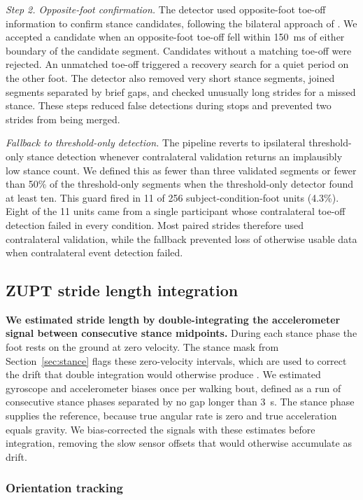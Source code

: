 \documentclass[11pt]{article}
\begin{document}
\textit{Step 2. Opposite-foot confirmation.} The detector used opposite-foot toe-off information to confirm stance candidates, following the bilateral approach of \citet{Arens2021}. We accepted a candidate when an opposite-foot toe-off fell within 150~ms of either boundary of the candidate segment. Candidates without a matching toe-off were rejected. An unmatched toe-off triggered a recovery search for a quiet period on the other foot. The detector also removed very short stance segments, joined segments separated by brief gaps, and checked unusually long strides for a missed stance. These steps reduced false detections during stops and prevented two strides from being merged.

\textit{Fallback to threshold-only detection.} The pipeline reverts to ipsilateral threshold-only stance detection whenever contralateral validation returns an implausibly low stance count. We defined this as fewer than three validated segments or fewer than 50\% of the threshold-only segments when the threshold-only detector found at least ten. This guard fired in 11 of 256 subject-condition-foot units (4.3\%). Eight of the 11 units came from a single participant whose contralateral toe-off detection failed in every condition. Most paired strides therefore used contralateral validation, while the fallback prevented loss of otherwise usable data when contralateral event detection failed.

\subsection{ZUPT stride length integration}

\textbf{We estimated stride length by double-integrating the accelerometer signal between consecutive stance midpoints.} During each stance phase the foot rests on the ground at zero velocity. The stance mask from Section~\ref{sec:stance} flags these zero-velocity intervals, which are used to correct the drift that double integration would otherwise produce \citep{Foxlin2005, Skog2010}. We estimated gyroscope and accelerometer biases once per walking bout, defined as a run of consecutive stance phases separated by no gap longer than 3~s. The stance phase supplies the reference, because true angular rate is zero and true acceleration equals gravity. We bias-corrected the signals with these estimates before integration, removing the slow sensor offsets that would otherwise accumulate as drift.

\subsubsection{Orientation tracking}
\end{document}
